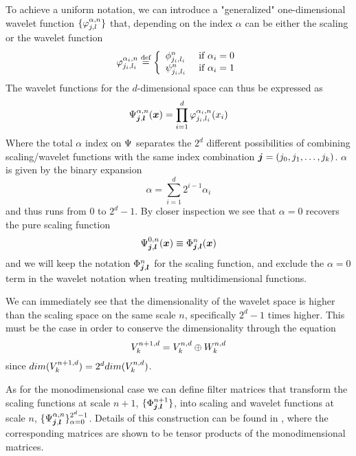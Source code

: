 To achieve a uniform notation, we can introduce a "generalized" one-dimensional
wavelet function $\lbrace\varphi_{j,l}^{\alpha,n}\rbrace$ that, depending on 
the index $\alpha$ can be either the scaling or the wavelet function
\begin{equation}
    \varphi^{\alpha_i,n}_{j_i,l_i} \stackrel{\text{def}}{\hbox{=}} 
    \left\{
	\begin{array}{lll}
	    \phi^n_{j_i,l_i}	&\mbox{ if }\alpha_i = 0\\
	    \psi^n_{j_i,l_i}	&\mbox{ if }\alpha_i = 1
	\end{array}
    \right.
\end{equation}
The wavelet functions for the $d$-dimensional space can thus be expressed as
\begin{equation}
    \Psi^{\alpha,n}_{\boldsymbol j, \boldsymbol l}(\boldsymbol x) =
    \prod_{i=1}^d\varphi^{\alpha_i,n}_{j_i,l_i}(x_i)
\end{equation}
Where the total $\alpha$ index on $\Psi$ separates the $2^d$ different
possibilities of combining scaling/wavelet functions with the same index
combination $\boldsymbol j = (j_0,j_1,\dots,j_k)$. $\alpha$ is given by the 
binary expansion
\begin{equation}
    \alpha = \sum_{i=1}^d 2^{i-1}\alpha_i
\end{equation}
and thus runs from $0$ to $2^d-1$. By closer inspection we see that $\alpha=0$
recovers the pure scaling function
\begin{equation}
    \Psi^{0,n}_{\boldsymbol j,\boldsymbol l}(\boldsymbol x) \equiv
    \Phi^n_{\boldsymbol j,\boldsymbol l}(\boldsymbol x)
\end{equation}
and we will keep the notation $\Phi^n_{\boldsymbol j,\boldsymbol l}$ for the
scaling function, and exclude the $\alpha=0$ term in the wavelet notation
when treating multidimensional functions.

We can immediately see that the dimensionality of the wavelet space is higher
than the scaling space on the same scale $n$, specifically $2^d-1$ times
higher. This must be the case in order to conserve the 
dimensionality through the equation
\begin{equation}
    {V}_{k}^{n+1,d} = {V}_{k}^{n,d} \oplus {W}_{k}^{n,d}
\end{equation}
since $dim({V}_{k}^{n+1,d}) = 2^d dim({V}_{k}^{n,d})$.

As for the monodimensional case we can define filter matrices that transform
the scaling functions at scale $n+1$,
$\lbrace\Phi^{n+1}_{\boldsymbol j,\boldsymbol l}\rbrace$, into scaling and 
wavelet functions at scale $n$, $\lbrace\Psi^{\alpha,n}_{\boldsymbol j,
\boldsymbol l}\rbrace_{\alpha=0}^{2^d-1}$. Details of this construction can be
found in \cite{Fossgaard}, where the corresponding matrices are shown to be 
tensor products of the monodimensional matrices. 

